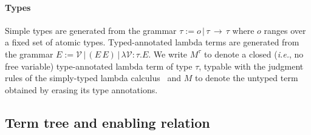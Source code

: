 \documentclass{elsarticle}
\makeatletter
\theoremstyle{plain}
\theoremstyle{definition}
\newcommand\VarSet{\mathcal{V}}
\renewcommand\ie{{\it i.e.\@\xspace}}
\makeatother
\begin{document}
\paragraph{Types} Simple types are generated from the grammar $\tau:= o\,|\,\tau\,\rightarrow\,\tau$ where $o$ ranges over a fixed set of atomic types. Typed-annotated lambda terms are generated from the grammar $E := \VarSet\, |\, (E\, E)\, |\, \lambda \VarSet \colon\tau. E $.
We write $M^\tau$ to denote a closed (\ie, no free variable)
type-annotated lambda term of type $\tau$, typable with the judgment rules of the simply-typed lambda calculus~\cite{Barendregt84} and $M$ to denote the untyped term obtained by erasing its type annotations.

\subsection{Term tree and enabling relation}
\end{document}

